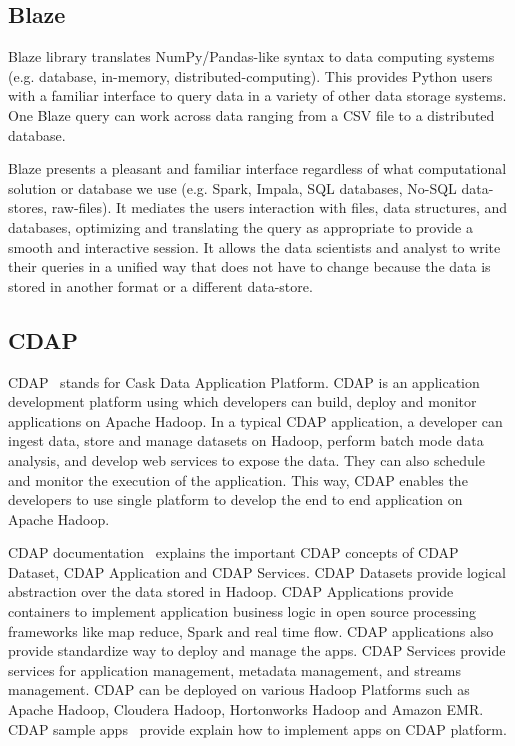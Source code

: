 {\subsection{Blaze \cv}

     Blaze library translates NumPy/Pandas-like syntax to data
     computing systems (e.g. database, in-memory,
     distributed-computing). This provides Python users with a
     familiar interface to query data in a variety of other data
     storage systems.  One Blaze query can work across data ranging
     from a CSV file to a distributed database.

     Blaze presents a pleasant and familiar interface regardless of
     what computational solution or database we use (e.g. Spark,
     Impala, SQL databases, No-SQL data-stores, raw-files). It
     mediates the users interaction with files, data structures, and
     databases, optimizing and translating the query as appropriate to
     provide a smooth and interactive session. It allows the data
     scientists and analyst to write their queries in a unified way
     that does not have to change because the data is stored in
     another format or a different data-store.~\cite{www-blaze}

\subsection{CDAP \cv}

CDAP~\cite{www-cdap} stands for Cask Data Application Platform. CDAP
is an application development platform using which developers can
build, deploy and monitor applications on Apache Hadoop. In a typical
CDAP application, a developer can ingest data, store and manage
datasets on Hadoop, perform batch mode data analysis, and develop web
services to expose the data.  They can also schedule and monitor the
execution of the application. This way, CDAP enables the developers to
use single platform to develop the end to end application on Apache
Hadoop.

CDAP documentation~\cite{www-cdap-docs} explains the important CDAP
concepts of CDAP Dataset, CDAP Application and CDAP Services. CDAP
Datasets provide logical abstraction over the data stored in
Hadoop. CDAP Applications provide containers to implement application
business logic in open source processing frameworks like map reduce,
Spark and real time flow. CDAP applications also provide standardize
way to deploy and manage the apps. CDAP Services provide services for
application management, metadata management, and streams management.
CDAP can be deployed on various Hadoop Platforms such as Apache
Hadoop, Cloudera Hadoop, Hortonworks Hadoop and Amazon EMR.  CDAP
sample apps~\cite{github-cdap-sample-apps} provide explain how to
implement apps on CDAP platform.

}
